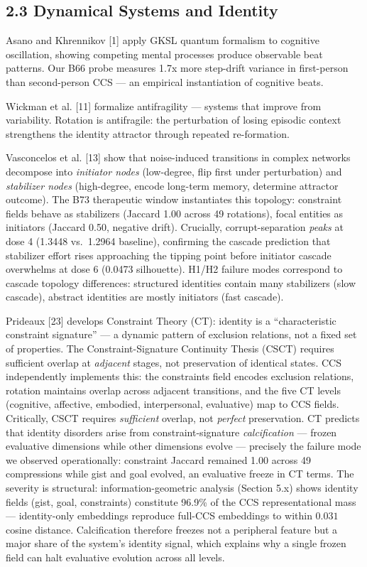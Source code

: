 \documentclass[11pt]{article}
\begin{document}
\subsection{2.3 Dynamical Systems and Identity}

Asano and Khrennikov [1] apply GKSL quantum formalism to cognitive oscillation,
showing competing mental processes produce observable beat patterns. Our B66
probe measures 1.7x more step-drift variance in first-person than second-person
CCS --- an empirical instantiation of cognitive beats.

Wickman et al. [11] formalize antifragility --- systems that improve from
variability. Rotation is antifragile: the perturbation of losing episodic
context strengthens the identity attractor through repeated re-formation.

Vasconcelos et al. [13] show that noise-induced transitions in complex networks
decompose into \emph{initiator nodes} (low-degree, flip first under perturbation)
and \emph{stabilizer nodes} (high-degree, encode long-term memory, determine
attractor outcome). The B73 therapeutic window instantiates this topology:
constraint fields behave as stabilizers (Jaccard 1.00 across 49 rotations),
focal entities as initiators (Jaccard 0.50, negative drift). Crucially,
corrupt-separation \emph{peaks} at dose 4 (1.3448 vs.\ 1.2964 baseline),
confirming the cascade prediction that stabilizer effort rises approaching
the tipping point before initiator cascade overwhelms at dose 6 (0.0473
silhouette). H1/H2 failure modes correspond to cascade topology differences:
structured identities contain many stabilizers (slow cascade), abstract
identities are mostly initiators (fast cascade).

Prideaux [23] develops Constraint Theory (CT): identity is a ``characteristic
constraint signature'' --- a dynamic pattern of exclusion relations, not a fixed
set of properties. The Constraint-Signature Continuity Thesis (CSCT) requires
sufficient overlap at \emph{adjacent} stages, not preservation of identical states.
CCS independently implements this: the constraints field encodes exclusion relations,
rotation maintains overlap across adjacent transitions, and the five CT levels
(cognitive, affective, embodied, interpersonal, evaluative) map to CCS fields.
Critically, CSCT requires \emph{sufficient} overlap, not \emph{perfect} preservation.
CT predicts that identity disorders arise from constraint-signature
\emph{calcification} --- frozen evaluative dimensions while other dimensions evolve ---
precisely the failure mode we observed operationally: constraint Jaccard remained
1.00 across 49 compressions while gist and goal evolved, an evaluative freeze in
CT terms. The severity is structural: information-geometric analysis (Section 5.x)
shows identity fields (gist, goal, constraints) constitute 96.9\% of the CCS
representational mass --- identity-only embeddings reproduce full-CCS embeddings
to within $0.031$ cosine distance. Calcification therefore freezes not a
peripheral feature but a major share of the system's identity signal, which
explains why a single frozen field can halt evaluative evolution across all
levels.
\end{document}
